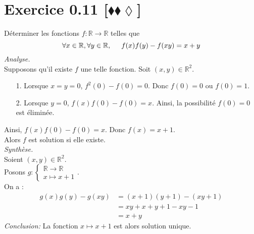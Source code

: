 \documentclass[10pt]{article}
\begin{document}
\section*{Exercice 0.11 [$\blacklozenge\blacklozenge\lozenge$]}
\begin{tcolorbox}[enhanced, width=7in, center, size=fbox, fontupper=\large, drop shadow southwest]
    Déterminer les fonctions $f: \mathbb{R} \rightarrow \mathbb{R}$ telles que 
    \begin{equation*}
        \forall{x\in\mathbb{R},\forall{y\in\mathbb{R}}, \hspace{0.5cm} f(x)f(y) - f(xy) = x + y}
    \end{equation*}
    \emph{Analyse.}\\
    Supposons qu'il existe $f$ une telle fonction. Soit $(x,y)\in\mathbb{R}^2$.
    \begin{itemize}
        \item[1.] Lorsque $x=y=0$, $f^2(0)-f(0)=0$. Donc $f(0) = 0$ ou $f(0) = 1$.
        \item[2.] Lorsque $y=0$, $f(x)f(0)-f(0)=x$. Ainsi, la possibilité $f(0)=0$ est éliminée.
    \end{itemize}
    Ainsi, $f(x)f(0)-f(0)=x$. Donc $f(x)=x+1$.\\
    Alors $f$ est solution si elle existe.\\[0.25cm]
    \emph{Synthèse.}\\
    Soient $(x,y)\in\mathbb{R}^2$.\\
    Posons $g: \begin{cases}\mathbb{R}\rightarrow\mathbb{R}\\x\mapsto{x+1}\end{cases}$.\\
    On a :
    \begin{align*}
        g(x)g(y)-g(xy)
        &=(x+1)(y+1)-(xy+1)\\
        &=xy+x+y+1-xy-1\\
        &=x+y
    \end{align*}
    \emph{Conclusion:}
    La fonction $x\mapsto x+1$ est alors solution unique.
\end{tcolorbox}
\end{document}
